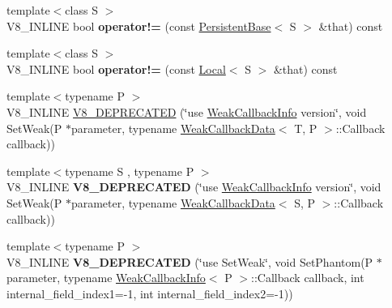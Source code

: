 \begin{DoxyCompactItemize}
\item 
{\footnotesize template$<$class S $>$ }\\V8\+\_\+\+I\+N\+L\+I\+NE bool {\bfseries operator!=} (const \hyperlink{classv8_1_1PersistentBase}{Persistent\+Base}$<$ S $>$ \&that) const \hypertarget{classv8_1_1PersistentBase_a5bfacec9ab828f9aa7abdb980481589a}{}\label{classv8_1_1PersistentBase_a5bfacec9ab828f9aa7abdb980481589a}

\item 
{\footnotesize template$<$class S $>$ }\\V8\+\_\+\+I\+N\+L\+I\+NE bool {\bfseries operator!=} (const \hyperlink{classv8_1_1Local}{Local}$<$ S $>$ \&that) const \hypertarget{classv8_1_1PersistentBase_a467b78e40a53fb8324369d8a7a147800}{}\label{classv8_1_1PersistentBase_a467b78e40a53fb8324369d8a7a147800}

\item 
{\footnotesize template$<$typename P $>$ }\\V8\+\_\+\+I\+N\+L\+I\+NE \hyperlink{classv8_1_1PersistentBase_a64bcb00b5b075107304e0f1a867d15d4}{V8\+\_\+\+D\+E\+P\+R\+E\+C\+A\+T\+ED} (\char`\"{}use \hyperlink{classv8_1_1WeakCallbackInfo}{Weak\+Callback\+Info} version\char`\"{}, void Set\+Weak(P $\ast$parameter,                                                                   typename \hyperlink{classv8_1_1WeakCallbackData}{Weak\+Callback\+Data}$<$ T, P $>$\+::Callback callback))
\item 
{\footnotesize template$<$typename S , typename P $>$ }\\V8\+\_\+\+I\+N\+L\+I\+NE {\bfseries V8\+\_\+\+D\+E\+P\+R\+E\+C\+A\+T\+ED} (\char`\"{}use \hyperlink{classv8_1_1WeakCallbackInfo}{Weak\+Callback\+Info} version\char`\"{}, void Set\+Weak(P $\ast$parameter,                                                                   typename \hyperlink{classv8_1_1WeakCallbackData}{Weak\+Callback\+Data}$<$ S, P $>$\+::Callback callback))\hypertarget{classv8_1_1PersistentBase_a1e4aaa31c63db650c6db3bf6b976e8a1}{}\label{classv8_1_1PersistentBase_a1e4aaa31c63db650c6db3bf6b976e8a1}

\item 
{\footnotesize template$<$typename P $>$ }\\V8\+\_\+\+I\+N\+L\+I\+NE {\bfseries V8\+\_\+\+D\+E\+P\+R\+E\+C\+A\+T\+ED} (\char`\"{}use Set\+Weak\char`\"{}, void Set\+Phantom(P $\ast$parameter,                                                                               typename \hyperlink{classv8_1_1WeakCallbackInfo}{Weak\+Callback\+Info}$<$ P $>$\+::Callback callback,                                                                               int internal\+\_\+field\+\_\+index1=-\/1,                                                                               int internal\+\_\+field\+\_\+index2=-\/1))\hypertarget{classv8_1_1PersistentBase_ae717cd28f0b6f52a705e24a8b3b49b19}{}\label{classv8_1_1PersistentBase_ae717cd28f0b6f52a705e24a8b3b49b19}


\end{DoxyCompactItemize}
